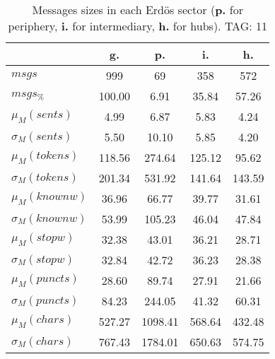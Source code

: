 \begin{table}[h!]
\begin{center}
\begin{tabular}{| l || c | c | c | c |}\hline
 & {\bf g.} & {\bf p.} & {\bf i.} & {\bf h.} \\\hline\hline
$msgs$ & 999  & 69  & 358  & 572 \\
$msgs_{\%}$ & 100.00  & 6.91  & 35.84  & 57.26 \\\hline
$\mu_M(sents)$ & 4.99  & 6.87  & 5.83  & 4.24 \\
$\sigma_M(sents)$ & 5.50  & 10.10  & 5.85  & 4.20 \\\hline
$\mu_M(tokens)$ & 118.56  & 274.64  & 125.12  & 95.62 \\
$\sigma_M(tokens)$ & 201.34  & 531.92  & 141.64  & 143.59 \\\hline
$\mu_M(knownw)$ & 36.96  & 66.77  & 39.77  & 31.61 \\
$\sigma_M(knownw)$ & 53.99  & 105.23  & 46.04  & 47.84 \\\hline
$\mu_M(stopw)$ & 32.38  & 43.01  & 36.21  & 28.71 \\
$\sigma_M(stopw)$ & 32.84  & 42.72  & 36.23  & 28.38 \\\hline
$\mu_M(puncts)$ & 28.60  & 89.74  & 27.91  & 21.66 \\
$\sigma_M(puncts)$ & 84.23  & 244.05  & 41.32  & 60.31 \\\hline
$\mu_M(chars)$ & 527.27  & 1098.41  & 568.64  & 432.48 \\
$\sigma_M(chars)$ & 767.43  & 1784.01  & 650.63  & 574.75 \\\hline
\end{tabular}
\caption{Messages sizes in each Erd\"os sector ({{\bf p.}} for periphery, {{\bf i.}} for intermediary, {{\bf h.}} for hubs). TAG: 11}
\end{center}
\end{table}